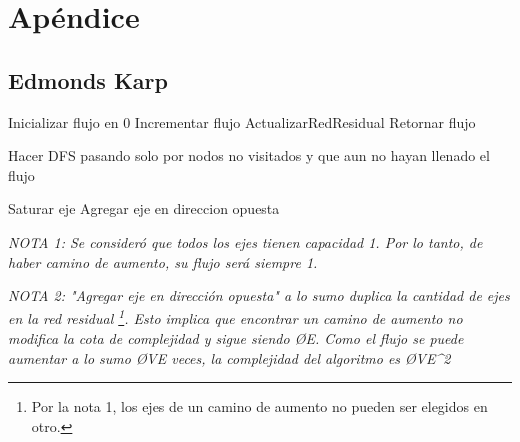\section{Apéndice}
\subsection{Edmonds Karp}\label{edmkarp}
\begin{algorithmic}
	\State Inicializar flujo en 0
		\State Incrementar flujo
		\State ActualizarRedResidual
	\EndWhile
	\State Retornar flujo
\end{algorithmic}

\vspace{1em}

\begin{algorithmic}
	\State Hacer DFS pasando solo por nodos no visitados y que aun no hayan llenado el flujo
\EndFunction

\vspace{1em}

		\State Saturar eje
		\State Agregar eje en direccion opuesta
	\EndFor
\EndFunction
\end{algorithmic}

\emph{NOTA 1: Se consideró que todos los ejes tienen capacidad 1. Por lo tanto, de haber camino de aumento, su flujo será siempre 1.}

\emph{NOTA 2: "Agregar eje en direcci\'on opuesta" a lo sumo duplica la cantidad de ejes en la red residual \footnote{Por la nota 1, los ejes de un camino de aumento no pueden ser elegidos en otro.}. Esto implica que encontrar un camino de aumento no modifica la cota de complejidad y sigue siendo \O{E}. Como el flujo se puede aumentar a lo sumo \O{VE}\textsuperscript{\cite{cormen}} veces, la complejidad del algoritmo es \O{VE^2}}
